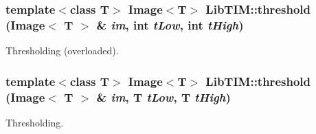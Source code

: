 \subsubsection{\setlength{\rightskip}{0pt plus 5cm}template$<$class T$>$ Image$<$T$>$ Lib\-TIM::threshold (Image$<$ T $>$ \& {\em im}, int {\em t\-Low}, int {\em t\-High})}\label{group__thresholding_ga1}


Thresholding (overloaded). 

\subsubsection{\setlength{\rightskip}{0pt plus 5cm}template$<$class T$>$ Image$<$T$>$ Lib\-TIM::threshold (Image$<$ T $>$ \& {\em im}, T {\em t\-Low}, T {\em t\-High})}\label{group__thresholding_ga0}


Thresholding. 

